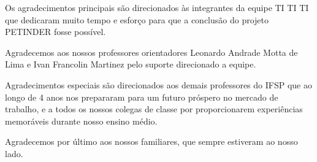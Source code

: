 \begin{agradecimentos}

Os agradecimentos principais são direcionados às integrantes da equipe TI TI TI que dedicaram muito tempo e esforço para que a conclusão do projeto PETINDER fosse possível.  

Agradecemos aos nossos professores orientadores Leonardo Andrade Motta de Lima e Ivan Francolin Martinez pelo suporte direcionado a equipe.

Agradecimentos especiais são direcionados aos demais professores do \ac{IFSP} que ao longo de 4 anos nos prepararam para um futuro próspero no mercado de trabalho, e a todos os nossos colegas de classe por proporcionarem experiências memoráveis durante nosso ensino médio.

Agradecemos por último aos nossos familiares, que sempre estiveram ao nosso lado.

\end{agradecimentos}
